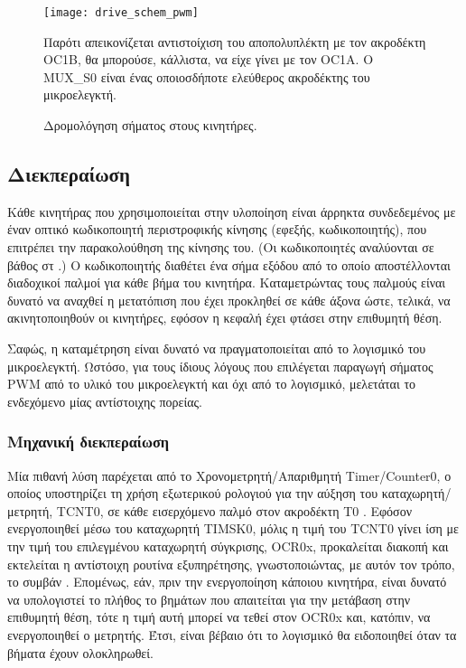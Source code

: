 \begin{figure}
    \caption{Δρομολόγηση σήματος στους κινητήρες.
    \label{fig:motor:route_pwm}}
    \begin{center}
    \texttt{[image: drive\_schem\_pwm]}
    \end{center}
Παρότι απεικονίζεται αντιστοίχιση του αποπολυπλέκτη με τον ακροδέκτη OC1B, θα
μπορούσε, κάλλιστα, να είχε γίνει με τον OC1A. Ο MUX\_S0 είναι ένας οποιοσδήποτε
ελεύθερος ακροδέκτης του μικροελεγκτή.
\end{figure}


\subsection{Διεκπεραίωση}

Κάθε κινητήρας που χρησιμοποιείται στην υλοποίηση είναι άρρηκτα συνδεδεμένος με
έναν οπτικό κωδικοποιητή περιστροφικής κίνησης (εφεξής, κωδικοποιητής), που
επιτρέπει την παρακολούθηση της κίνησης του. (Οι κωδικοποιητές αναλύονται σε
βάθος στ \nref.)
Ο κωδικοποιητής διαθέτει ένα σήμα εξόδου από το οποίο αποστέλλονται διαδοχικοί
παλμοί για κάθε βήμα του κινητήρα. Καταμετρώντας τους παλμούς είναι δυνατό να
αναχθεί η μετατόπιση που έχει προκληθεί σε κάθε άξονα ώστε, τελικά, να
ακινητοποιηθούν οι κινητήρες, εφόσον η κεφαλή έχει φτάσει στην επιθυμητή θέση.

Σαφώς, η καταμέτρηση είναι δυνατό να πραγματοποιείται από το λογισμικό του
μικροελεγκτή. Ωστόσο, για τους ίδιους λόγους που επιλέγεται παραγωγή σήματος PWM
από το υλικό του μικροελεγκτή και όχι από το λογισμικό, μελετάται το ενδεχόμενο
μίας αντίστοιχης πορείας.


\subsubsection{Μηχανική διεκπεραίωση}

Μία πιθανή λύση παρέχεται από το Χρονομετρητή\slash Απαριθμητή
\textenglish{Timer\slash Counter0}, ο οποίος υποστηρίζει τη χρήση εξωτερικού
ρολογιού για την αύξηση του καταχωρητή\slash μετρητή, TCNT0, σε κάθε εισερχόμενο
παλμό στον ακροδέκτη T0 \parencite[109]{atmel13}. Εφόσον ενεργοποιηθεί μέσω του
καταχωρητή TIMSK0, μόλις η τιμή του TCNT0 γίνει ίση με την τιμή του επιλεγμένου
καταχωρητή σύγκρισης, OCR0x, προκαλείται διακοπή και εκτελείται η αντίστοιχη
ρουτίνα εξυπηρέτησης, γνωστοποιώντας, με αυτόν τον τρόπο, το συμβάν
\parencite[110]{atmel13}. Επομένως, εάν, πριν την ενεργοποίηση κάποιου κινητήρα,
είναι δυνατό να υπολογιστεί το πλήθος το βημάτων που απαιτείται για την μετάβαση
στην επιθυμητή θέση, τότε η τιμή αυτή μπορεί να τεθεί στον OCR0x και, κατόπιν,
να ενεργοποιηθεί ο μετρητής. Έτσι, είναι βέβαιο ότι το λογισμικό θα ειδοποιηθεί
όταν τα βήματα έχουν ολοκληρωθεί.

